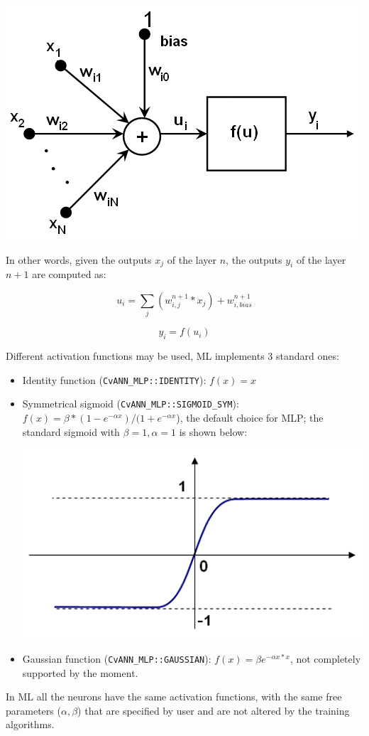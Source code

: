 \includegraphics{pics/neuron_model.png}

In other words, given the outputs $x_j$ of the layer $n$, the outputs $y_i$ of the layer $n+1$ are computed as:

\[
    u_i = \sum_j (w^{n+1}_{i,j}*x_j) + w^{n+1}_{i,bias}
\]

\[
    y_i = f(u_i)
\]

Different activation functions may be used, ML implements 3 standard ones:
\begin{itemize}
\item Identity function (\texttt{CvANN\_MLP::IDENTITY}): $f(x)=x$
\item Symmetrical sigmoid (\texttt{CvANN\_MLP::SIGMOID\_SYM}): $f(x)=\beta*(1-e^{-\alpha x})/(1+e^{-\alpha x}$), the default choice for MLP; the standard sigmoid with $\beta =1, \alpha =1$ is shown below:

\includegraphics{pics/sigmoid_bipolar.png} 

\item Gaussian function (\texttt{CvANN\_MLP::GAUSSIAN}): $f(x)=\beta e^{-\alpha x*x}$, not completely supported by the moment.
\end{itemize}
In ML all the neurons have the same activation functions, with the same free parameters ($\alpha, \beta$) that are specified by user and are not altered by the training algorithms.

